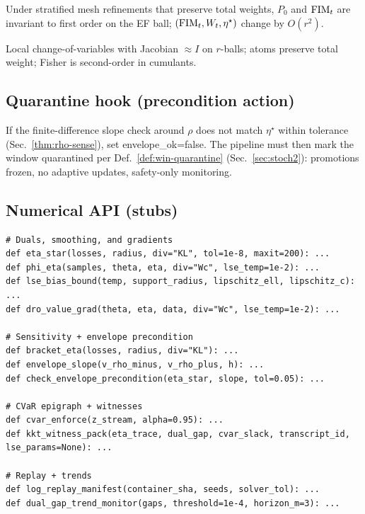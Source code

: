 \begin{lemma}\label{lem:refinement}
\emph{}
Under stratified mesh refinements that preserve total weights, $P_0$ and $\mathrm{FIM}_t$ are invariant to first order on the EF ball; $(\mathrm{FIM}_t,W_t,\eta^\star)$ change by $O(r^2)$.
\begin{proofsketch}
Local change-of-variables with Jacobian $\approx I$ on $r$-balls; atoms preserve total weight; Fisher is second-order in cumulants.
\end{proofsketch}
\end{lemma}

\subsection*{Quarantine hook (precondition \textrightarrow{} action)}
If the finite-difference slope check around $\rho$ does not match $\eta^\star$ within tolerance (Sec.~\ref{thm:rho-sense}), set \textsf{envelope\_ok}=\textsf{false}.
The pipeline must then mark the window \textsf{quarantined} per Def.~\ref{def:win-quarantine} (Sec.~\ref{sec:stoch2}): promotions frozen, no adaptive updates, safety-only monitoring.

\subsection*{Numerical API (stubs)}
\begin{lstlisting}
# Duals, smoothing, and gradients
def eta_star(losses, radius, div="KL", tol=1e-8, maxit=200): ...
def phi_eta(samples, theta, eta, div="Wc", lse_temp=1e-2): ...
def lse_bias_bound(temp, support_radius, lipschitz_ell, lipschitz_c): ...
def dro_value_grad(theta, eta, data, div="Wc", lse_temp=1e-2): ...

# Sensitivity + envelope precondition
def bracket_eta(losses, radius, div="KL"): ...
def envelope_slope(v_rho_minus, v_rho_plus, h): ...
def check_envelope_precondition(eta_star, slope, tol=0.05): ...

# CVaR epigraph + witnesses
def cvar_enforce(z_stream, alpha=0.95): ...
def kkt_witness_pack(eta_trace, dual_gap, cvar_slack, transcript_id, lse_params=None): ...

# Replay + trends
def log_replay_manifest(container_sha, seeds, solver_tol): ...
def dual_gap_trend_monitor(gaps, threshold=1e-4, horizon_m=3): ...
\end{lstlisting}

